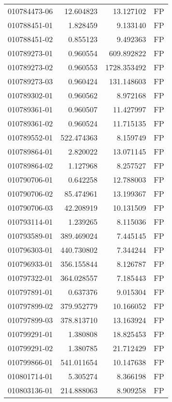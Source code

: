 \begin{tabular}{lrrl}
010784473-06 &   12.604823 &      13.127102 &   FP \\
010788451-01 &    1.828459 &       9.133140 &   FP \\
010788451-02 &    0.855123 &       9.492363 &   FP \\
010789273-01 &    0.960554 &     609.892822 &   FP \\
010789273-02 &    0.960553 &    1728.353492 &   FP \\
010789273-03 &    0.960424 &     131.148603 &   FP \\
010789302-01 &    0.960562 &       8.972168 &   FP \\
010789361-01 &    0.960507 &      11.427997 &   FP \\
010789361-02 &    0.960524 &      11.715135 &   FP \\
010789552-01 &  522.474363 &       8.159749 &   FP \\
010789864-01 &    2.820022 &      13.071145 &   FP \\
010789864-02 &    1.127968 &       8.257527 &   FP \\
010790706-01 &    0.642258 &      12.788003 &   FP \\
010790706-02 &   85.474961 &      13.199367 &   FP \\
010790706-03 &   42.208919 &      10.131509 &   FP \\
010793114-01 &    1.239265 &       8.115036 &   FP \\
010793589-01 &  389.469024 &       7.445145 &   FP \\
010796303-01 &  440.730802 &       7.344244 &   FP \\
010796933-01 &  356.155844 &       8.126787 &   FP \\
010797322-01 &  364.028557 &       7.185443 &   FP \\
010797891-01 &    0.637376 &       9.015304 &   FP \\
010797899-02 &  379.952779 &      10.166052 &   FP \\
010797899-03 &  378.813710 &      13.163924 &   FP \\
010799291-01 &    1.380808 &      18.825453 &   FP \\
010799291-02 &    1.380785 &      21.712429 &   FP \\
010799866-01 &  541.011654 &      10.147638 &   FP \\
010801714-01 &    5.305274 &       8.366198 &   FP \\
010803136-01 &  214.888063 &       8.909258 &   FP \\

\end{tabular}
